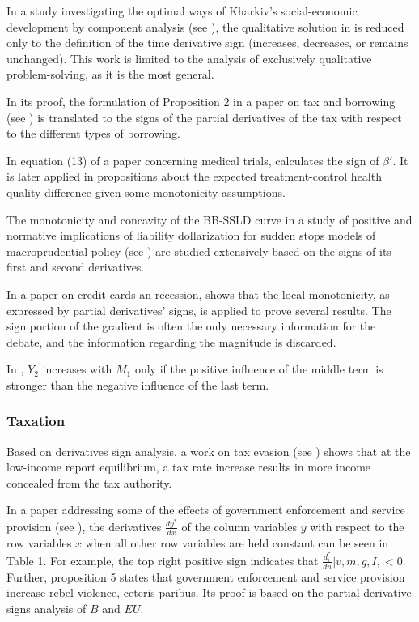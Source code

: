 \documentclass[11pt]{book}
\begin{document}
In a study investigating the optimal ways of Kharkiv’s social-economic development by
component analysis (see \cite{mazurova2017defining}), the qualitative solution in  is reduced
only to the definition of the time derivative sign (increases, decreases,
or remains unchanged). This work is limited to the analysis of exclusively
qualitative problem-solving, as it is the most general.

In its proof, the formulation of Proposition 2 in a paper on tax and borrowing (see \cite{bengui2018macroprudential})
is translated to the signs of the partial derivatives of the tax with
respect to the different types of borrowing.

In equation (13) of a paper concerning medical trials, \cite{chemla2018subject} calculates the sign of
$\beta'$. It is later applied in propositions about the expected
treatment-control health quality difference given some monotonicity
assumptions.

The monotonicity and concavity of the BB-SSLD curve in a study of positive and normative implications of liability
dollarization for sudden stops models of macroprudential policy (see \cite{mendoza2019positive}) are studied extensively based on the signs of its first and second
derivatives.

In a paper on credit cards an recession, \cite{drozd2019credit} shows that the local monotonicity, as expressed
by partial derivatives' signs, is applied to prove several results. The sign portion of the gradient
is often the only necessary information for the debate, and the information
regarding the magnitude is discarded.

In \cite{ferret2021green}, $Y_{2}$ increases with $M_{1}$ only
if the positive influence of the middle term is stronger than the negative
influence of the last term.


\subsubsection{Taxation}

Based on derivatives sign analysis, a work on tax evasion (see \cite{panades2004tax}) shows
that at the low-income report equilibrium, a tax rate increase results
in more income concealed from the tax authority.

In a paper addressing some of the effects of government enforcement and service
provision (see \cite{berman2013predation}), the derivatives $\frac{dy^{*}}{dx}$
of the column variables $y$ with respect to the row variables $x$
when all other row variables are held constant can be seen in Table 1. For example, the top
right positive sign indicates that $\frac{d_{i}^{*}}{dn}|v,m,g,I,<0$.
Further, proposition 5 states that government enforcement and service
provision increase rebel violence, ceteris paribus. Its proof is based
on the partial derivative signs analysis of $B$ and $EU$.
\end{document}
